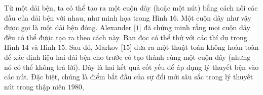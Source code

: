 \begin{multicols}{2}
\begin{figure}[H]
	\end{figure}
	Từ một dải bện, ta có thể tạo ra một cuộn dây (hoặc một nút) bằng cách nối các đầu của dải bện với nhau, như minh họa trong Hình $16$. Một cuộn dây như vậy được gọi là một dải bện đóng. Alexander [$1$] đã chứng minh rằng mọi cuộn dây đều có thể được tạo ra theo cách này. Bạn đọc có thể thử với các thí dụ trong Hình $14$ và Hình $15$. Sau đó, Markov [$15$] đưa ra một thuật toán không hoàn toàn để xác định liệu hai dải bện cho trước có tạo thành cùng một cuộn dây (nhưng nó có thể không trả lời). Đây là hai kết quả cốt yếu để áp dụng lý thuyết bện vào các nút. Đặc biệt, chúng là điểm bắt đầu của sự đổi mới sâu sắc trong lý thuyết nút trong thập niên $1980$,
%

\end{multicols}
